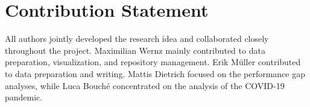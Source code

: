\documentclass{article}
\begin{document}
\clearpage

\section*{Contribution Statement}
All authors jointly developed the research idea and collaborated closely throughout the project. Maximilian Wernz mainly contributed to data preparation, visualization, and repository management. Erik Müller contributed to data preparation and writing. Mattis Dietrich focused on the performance gap analyses, while Luca Bouché concentrated on the analysis of the COVID-19 pandemic.

{\raggedright


}
\end{document}
